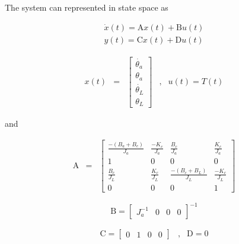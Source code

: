 \noindent The system can represented in state space as

\begin{equation}
\begin{array}{c}
\dot{x}(t) = \mbox{A}x(t) + \mbox{B}u(t) \\
y(t) = \mbox{C}x(t) + \mbox{D}u(t)
\end{array}
\end{equation}

\begin{equation}\label{eq:ssTR}
\begin{array}{llllll}

x(t)
&

 =

&

 
\left[
\begin{array}{l}
\dot{\theta_a} 	\\ 
\theta_a		\\
\dot{\theta_L}	\\
\theta_L
\end{array}
\right]



&


,


&

u(t) =T(t)


\end{array}
\end{equation}


and


\begin{equation}
\begin{array}{ccc}
\mbox{A}
&
=
&

\left[
\begin{array}{cccc}
\frac{-(B_a+B_c)}{J_a}   	& \frac{-K_c}{J_a}   	& \frac{B_c}{J_a}   		&	\frac{K_c}{J_a} \\
1 					& 0				& 0					&	0			\\
\frac{B_c}{J_L}			& \frac{K_c}{J_L}	& \frac{-(B_c+B_L)}{J_L}	& 	\frac{-K_c}{J_L} \\
0					& 0				& 0					&	1		
\end{array}

\right]


\end{array}
\end{equation}



\begin{equation}
\mbox{B} = 
\left[
\begin{array}{cccc}
J^{-1}_a 	&
0		&
0		&
0
\end{array}
\right]^{-1}
\end{equation}

\begin{equation}
\begin{array}{ccc}
\mbox{C}
=
\left[
\begin{array}{cccc}
0 	&	1	&	0	&	0
\end{array}
\right]
&
,
&
\mbox{D} = 0
\end{array}
\end{equation}
